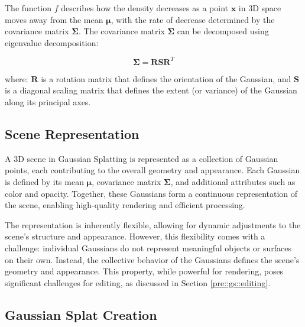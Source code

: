 The function \( f \) describes how the density decreases as a point \( \mathbf{x} \) in 3D space moves away from the mean \( \boldsymbol{\mu} \), with the rate of decrease determined by the covariance matrix \( \boldsymbol{\Sigma} \). The covariance matrix \( \boldsymbol{\Sigma} \) can be decomposed using eigenvalue decomposition:

\begin{equation}
\boldsymbol{\Sigma} = \mathbf{R}\mathbf{S}\mathbf{R}^T
\end{equation}

where:
\( \mathbf{R} \) is a rotation matrix that defines the orientation of the Gaussian, and
\( \mathbf{S} \) is a diagonal scaling matrix that defines the extent (or variance) of the Gaussian along its principal axes.








\subsection{Scene Representation}

\label{pre::gs::scene-representation}

A 3D scene in Gaussian Splatting is represented as a collection of Gaussian points, each contributing to the overall geometry and appearance. Each Gaussian is defined by its mean \(\boldsymbol{\mu}\), covariance matrix \(\boldsymbol{\Sigma}\), and additional attributes such as color and opacity. Together, these Gaussians form a continuous representation of the scene, enabling high-quality rendering and efficient processing.

The representation is inherently flexible, allowing for dynamic adjustments to the scene's structure and appearance. However, this flexibility comes with a challenge: individual Gaussians do not represent meaningful objects or surfaces on their own. Instead, the collective behavior of the Gaussians defines the scene's geometry and appearance. This property, while powerful for rendering, poses significant challenges for editing, as discussed in Section \ref{pre::gs::editing}.














\subsection{Gaussian Splat Creation}

